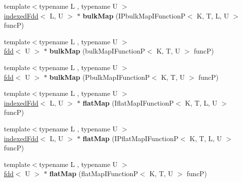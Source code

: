 \begin{DoxyCompactItemize}
\item 
\hypertarget{classfaster_1_1indexedFdd_a2989dde370e2c25e98434249a8cc5130}{}{\footnotesize template$<$typename L , typename U $>$ }\\\hyperlink{classfaster_1_1indexedFdd}{indexed\+Fdd}$<$ L, U $>$ $\ast$ {\bfseries bulk\+Map} (I\+Pbulk\+Map\+I\+Function\+P$<$ K, T, L, U $>$ func\+P)\label{classfaster_1_1indexedFdd_a2989dde370e2c25e98434249a8cc5130}

\item 
\hypertarget{classfaster_1_1indexedFdd_a661567a1e05b508619c9399b2149d7d7}{}{\footnotesize template$<$typename L , typename U $>$ }\\\hyperlink{classfaster_1_1fdd}{fdd}$<$ U $>$ $\ast$ {\bfseries bulk\+Map} (bulk\+Map\+I\+Function\+P$<$ K, T, U $>$ func\+P)\label{classfaster_1_1indexedFdd_a661567a1e05b508619c9399b2149d7d7}

\item 
\hypertarget{classfaster_1_1indexedFdd_a73ba7acbff0aabd4e8f92d07c3920d3a}{}{\footnotesize template$<$typename L , typename U $>$ }\\\hyperlink{classfaster_1_1fdd}{fdd}$<$ U $>$ $\ast$ {\bfseries bulk\+Map} (Pbulk\+Map\+I\+Function\+P$<$ K, T, U $>$ func\+P)\label{classfaster_1_1indexedFdd_a73ba7acbff0aabd4e8f92d07c3920d3a}

\item 
\hypertarget{classfaster_1_1indexedFdd_a9c104d832a84dc9f3f648db7c0ea1374}{}{\footnotesize template$<$typename L , typename U $>$ }\\\hyperlink{classfaster_1_1indexedFdd}{indexed\+Fdd}$<$ L, U $>$ $\ast$ {\bfseries flat\+Map} (Iflat\+Map\+I\+Function\+P$<$ K, T, L, U $>$ func\+P)\label{classfaster_1_1indexedFdd_a9c104d832a84dc9f3f648db7c0ea1374}

\item 
\hypertarget{classfaster_1_1indexedFdd_afe4a7200c3b0adfe13d9479b2e89d015}{}{\footnotesize template$<$typename L , typename U $>$ }\\\hyperlink{classfaster_1_1indexedFdd}{indexed\+Fdd}$<$ L, U $>$ $\ast$ {\bfseries flat\+Map} (I\+Pflat\+Map\+I\+Function\+P$<$ K, T, L, U $>$ func\+P)\label{classfaster_1_1indexedFdd_afe4a7200c3b0adfe13d9479b2e89d015}

\item 
\hypertarget{classfaster_1_1indexedFdd_ac43ac811a8e6341d835990da6d43e422}{}{\footnotesize template$<$typename L , typename U $>$ }\\\hyperlink{classfaster_1_1fdd}{fdd}$<$ U $>$ $\ast$ {\bfseries flat\+Map} (flat\+Map\+I\+Function\+P$<$ K, T, U $>$ func\+P)\label{classfaster_1_1indexedFdd_ac43ac811a8e6341d835990da6d43e422}


\end{DoxyCompactItemize}
